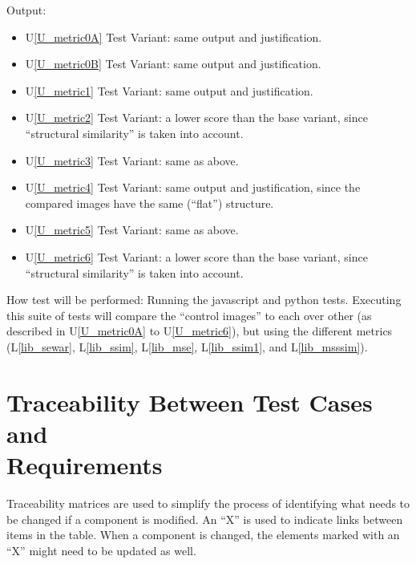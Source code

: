 \documentclass[12pt, titlepage]{article}
\newcommand{\utref}[1]{U\ref{#1}}
\newcommand{\lref}[1]{L\ref{#1}}
\begin{document}
\begin{itemize}
Output:
\begin{itemize}
  \item \utref{U_metric0A} Test Variant: same output and justification.
  \item \utref{U_metric0B} Test Variant: same output and justification.
  \item \utref{U_metric1} Test Variant: same output and justification.
  \item \utref{U_metric2} Test Variant: a lower score than the base variant,
    since ``structural similarity'' is taken into account.
  \item \utref{U_metric3} Test Variant: same as above.
  \item \utref{U_metric4} Test Variant: same output and justification,
    since the compared images have the same (``flat'') structure.
  \item \utref{U_metric5} Test Variant: same as above.
  \item \utref{U_metric6} Test Variant: a lower score than the base variant,
    since ``structural similarity'' is taken into account.
\end{itemize}

How test will be performed: Running the javascript and python tests.
Executing this suite of tests will compare the ``control images''
to each over other (as described in \utref{U_metric0A} to \utref{U_metric6}),
but using the different metrics
(\lref{lib_sewar}, \lref{lib_ssim}, \lref{lib_mse},
\lref{lib_ssim1}, and \lref{lib_msssim}).

\end{itemize}



\newpage
\clearpage

\section{Traceability Between Test Cases and \\ Requirements}
Traceability matrices are used to simplify the process of identifying what needs to be changed 
if a component is modified. An ``X'' is used to indicate links between items in the table. 
When a component is changed, the elements marked with an ``X'' might need to be updated as well.
\end{document}

